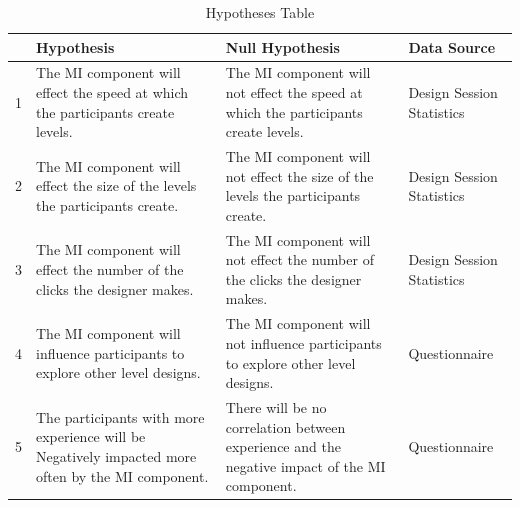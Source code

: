 \documentclass[journal]{IEEEtran}
\begin{document}
\begin{table}[h]
		\centering
		\caption{Hypotheses Table}
		\label{hyp}
		\def\arraystretch{1.5}
		\begin{tabular}{|c|p{7cm}|p{7cm}|p{1.75cm}|}
			\hline
			& \textbf{Hypothesis}& \textbf{Null Hypothesis} & \textbf{Data Source}\\\hline
			1 & The MI component will effect the speed at which the participants create levels.
			& The MI component will not effect the speed at which the participants create levels.
			& Design Session Statistics\\ \hline
			
			2 & The MI component will effect the size of the levels the participants create.
			&  The MI component will not effect the size of the levels the participants create.
			& Design Session Statistics\\ \hline

			3 & The MI component will effect the number of the clicks the designer makes.
			&  The MI component will not effect the number of the clicks the designer makes.
			& Design Session Statistics\\ \hline

			4 & The MI component will influence participants to explore other level designs.
			& The MI component will not influence participants to explore other level designs.
			&  Questionnaire\\ \hline

		          5 & The participants with more experience will be Negatively impacted more often by the MI component.
			&  There will be no correlation between experience and the negative impact of the MI component.
			& Questionnaire\\ \hline
			
		\end{tabular}
\end{table}
\end{document}
